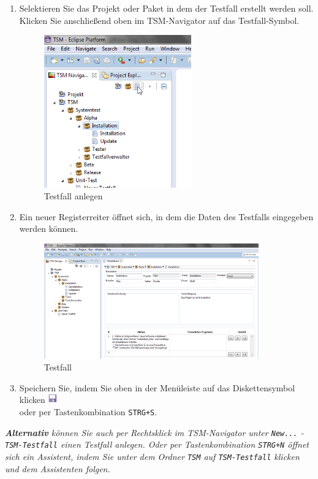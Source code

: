 \documentclass[11pt,a4paper,titlepage]{article}
\begin{document}
\begin{enumerate}
\item Selektieren Sie das Projekt oder Paket in dem der Testfall erstellt werden soll. Klicken Sie anschließend oben im TSM-Navigator auf das Testfall-Symbol.

\begin{figure}[H]
\centering
\includegraphics[width= 240px]{BilderHandbuchTSMNavigator/Testfall/Testfall.png}
\caption{Testfall anlegen}
\label{fig:Testfall}
\end{figure}

\item Ein neuer Registerreiter öffnet sich, in dem die Daten des Testfalls eingegeben werden können.

\begin{figure}[H]
\centering
\includegraphics[width= 350px]{BilderHandbuchTSMNavigator/Testfall/TestfallReiter.png}
\caption{Testfall}
\label{fig:TestfallReiter}
\end{figure}

\item Speichern Sie, indem Sie oben in der Menüleiste auf das
Diskettensymbol klicken
\includegraphics[width= 15px]{BilderHandbuch/Testfall/Disk.png}
\\ oder per Tastenkombination \texttt{STRG+S}.

\end{enumerate}
\textit{\textbf{Alternativ} können Sie auch per Rechtsklick im TSM-Navigator unter \texttt{New...} - \texttt{TSM-Testfall} einen Testfall anlegen.
Oder per Tastenkombination \texttt{STRG+N} öffnet sich ein Assistent, indem Sie unter dem Ordner \texttt{TSM} auf \texttt{TSM-Testfall} klicken und dem Assistenten folgen.}
\end{document}

